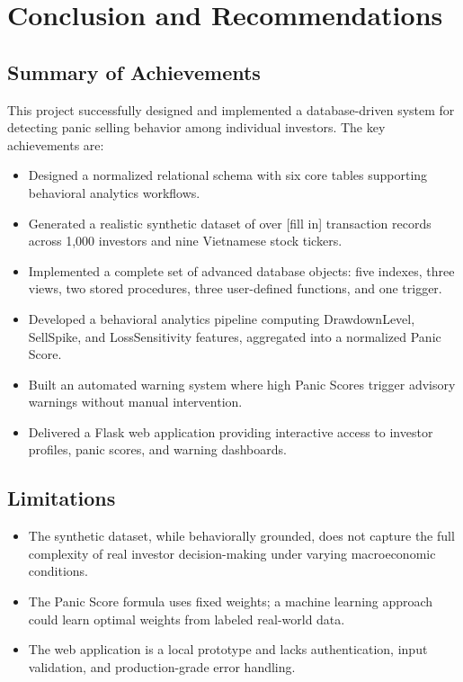 \chapter{Conclusion and Recommendations}
\label{chap:conclusion}

\section{Summary of Achievements}

This project successfully designed and implemented a database-driven system for detecting panic selling behavior among individual investors. The key achievements are:

\begin{itemize}
    \item Designed a normalized relational schema with six core tables supporting behavioral analytics workflows.
    \item Generated a realistic synthetic dataset of over [fill in] transaction records across 1,000 investors and nine Vietnamese stock tickers.
    \item Implemented a complete set of advanced database objects: five indexes, three views, two stored procedures, three user-defined functions, and one trigger.
    \item Developed a behavioral analytics pipeline computing DrawdownLevel, SellSpike, and LossSensitivity features, aggregated into a normalized Panic Score.
    \item Built an automated warning system where high Panic Scores trigger advisory warnings without manual intervention.
    \item Delivered a Flask web application providing interactive access to investor profiles, panic scores, and warning dashboards.
\end{itemize}

\section{Limitations}

\begin{itemize}
    \item The synthetic dataset, while behaviorally grounded, does not capture the full complexity of real investor decision-making under varying macroeconomic conditions.
    \item The Panic Score formula uses fixed weights; a machine learning approach could learn optimal weights from labeled real-world data.
    \item The web application is a local prototype and lacks authentication, input validation, and production-grade error handling.
\end{itemize}

